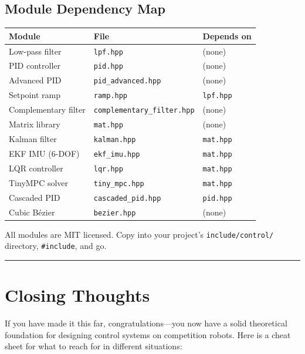 \subsection{Module Dependency Map}

\begin{center}
\begin{tabular}{lll}
\toprule
\textbf{Module} & \textbf{File} & \textbf{Depends on} \\
\midrule
Low-pass filter & \texttt{lpf.hpp} & (none) \\
PID controller & \texttt{pid.hpp} & (none) \\
Advanced PID & \texttt{pid\_advanced.hpp} & (none) \\
Setpoint ramp & \texttt{ramp.hpp} & \texttt{lpf.hpp} \\
Complementary filter & \texttt{complementary\_filter.hpp} & (none) \\
Matrix library & \texttt{mat.hpp} & (none) \\
Kalman filter & \texttt{kalman.hpp} & \texttt{mat.hpp} \\
EKF IMU (6-DOF) & \texttt{ekf\_imu.hpp} & \texttt{mat.hpp} \\
LQR controller & \texttt{lqr.hpp} & \texttt{mat.hpp} \\
TinyMPC solver & \texttt{tiny\_mpc.hpp} & \texttt{mat.hpp} \\
Cascaded PID & \texttt{cascaded\_pid.hpp} & \texttt{pid.hpp} \\
Cubic B\'{e}zier & \texttt{bezier.hpp} & (none) \\
\bottomrule
\end{tabular}
\end{center}

All modules are MIT licensed. Copy into your project's \texttt{include/control/} directory, \texttt{\#include}, and go.

\newpage

\vspace{1em}
\hrule
\vspace{1em}

\section*{Closing Thoughts}

If you have made it this far, congratulations---you now have a solid theoretical foundation for designing control systems on competition robots. Here is a cheat sheet for what to reach for in different situations:


